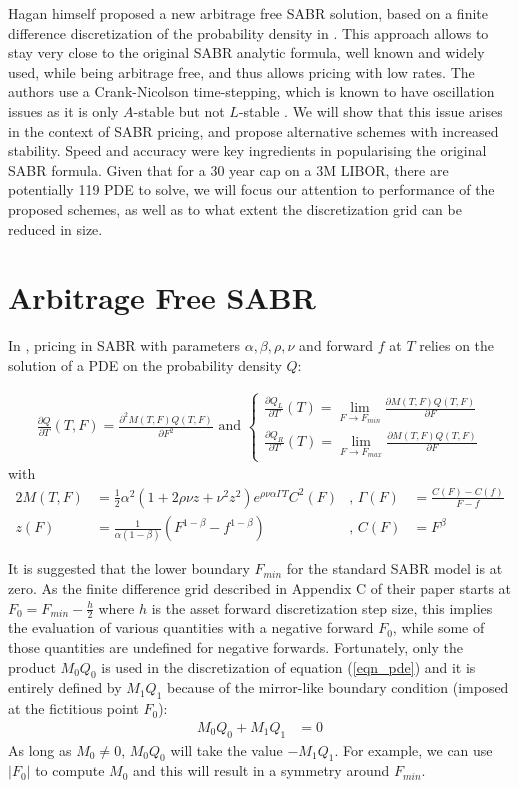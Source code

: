\documentclass[]{rAMF2e}
\begin{document}
Hagan himself proposed a new arbitrage free SABR solution, based on a finite difference discretization of the probability density in \citep{hagan2013arbitrage}. This approach allows to stay very close to the original SABR analytic formula, well known and widely used, while being arbitrage free, and thus allows pricing with low rates. The authors use a Crank-Nicolson time-stepping, which is known to have oscillation issues \citep{GiCa2006} as it is only $A$-stable but not $L$-stable \citep{Le07}. We will show that this issue arises in the context of SABR pricing, and propose alternative schemes with increased stability. Speed and accuracy were key ingredients in popularising the original SABR formula. Given that for a 30 year cap on a 3M LIBOR, there are potentially 119 PDE to solve, we will focus our attention to performance of the proposed schemes, as well as to what extent the discretization grid can be reduced in size.

\section{Arbitrage Free SABR}
In \citep{hagan2013arbitrage}, pricing in SABR with parameters $\alpha, \beta, \rho, \nu$ and forward $f$ at $T$ relies on the solution of a PDE on the probability density $Q$:

\begin{align}\label{eqn_pde}
\frac{\partial Q}{\partial T}(T,F) = \frac{\partial^2 M(T,F) Q(T,F)}{\partial F^2} \text{ and } \begin{cases}
\frac{\partial Q_L}{\partial T}(T) = \lim_{F \to F_{min}} \frac{\partial M(T,F) Q(T,F)}{\partial F}\\
\frac{\partial Q_R}{\partial T}(T) = \lim_{F \to F_{max}} \frac{\partial M(T,F) Q(T,F)}{\partial F}
\end{cases}
\end{align}
with
\begin{alignat}{2}
M(T,F) &= \frac{1}{2} \alpha^2 (1+2\rho\nu z+ \nu^2 z^2) e^{\rho\nu\alpha\Gamma T} C^2(F) &\text{, }
\Gamma(F) &= \frac{C(F)-C(f)}{F-f}\\
z(F) &= \frac{1}{\alpha (1-\beta)}(F^{1-\beta}-f^{1-\beta}) &\text{, }
C(F) &= F^{\beta} 
\end{alignat}

It is suggested that the lower boundary $F_{min}$ for the standard SABR model is at zero. As the finite difference grid described in Appendix C of their paper starts at  $F_0 = F_{min} - \frac{h}{2}$ where $h$ is the asset forward discretization step size, this implies the evaluation of various quantities with a negative forward $F_0$, while some of those quantities are undefined for negative forwards. Fortunately, only the product $M_0 Q_0$ is used in the discretization of equation (\ref{eqn_pde}) and it is entirely defined by $M_1 Q_1$  because of the mirror-like boundary condition (imposed at the fictitious point $F_0$): 
\begin{align}\label{boundary_condition}
M_0 Q_0 + M_1 Q_1 &= 0
\end{align}
As long as $M_0 \neq 0$, $M_0 Q_0$ will take the value $-M_1 Q_1$. For example, we can use $|F_0|$ to compute $M_0$ and this will result in a symmetry around $F_{min}$.
\end{document}
